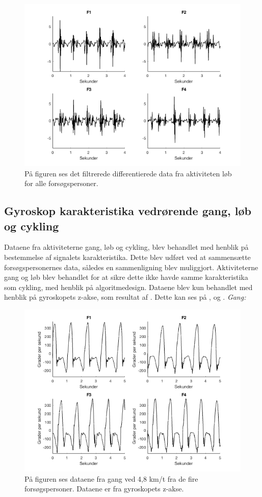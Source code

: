 \begin{figure}[H]
	\centering
	\includegraphics[scale=0.6]{figures/qBilag/loeb_diff}
	\caption{På figuren ses det filtrerede differentierede data fra aktiviteten løb for alle forsøgspersoner.}
	\label{fig:Ap_loebdiff}
\end{figure}

\subsection{Gyroskop karakteristika vedrørende gang, løb og cykling}
Dataene fra aktiviteterne gang, løb og cykling, blev behandlet med henblik på bestemmelse af signalets karakteristika. Dette blev udført ved at sammensætte forsøgspersonernes data, således en sammenligning blev muliggjort. Aktiviteterne gang og løb blev behandlet for at sikre dette ikke havde samme karakteristika som cykling, med henblik på algoritmedesign. Dataene blev kun behandlet med henblik på gyroskopets z-akse, som resultat af . Dette kan ses på ,  og .
\textit{Gang:}
\begin{figure}[H]
	\centering
	\includegraphics[scale=0.5]{figures/qBilag/gang_gyro}
	\caption{På figuren ses dataene fra gang ved 4,8 km/t fra de fire forsøgspersoner. Dataene er fra gyroskopets z-akse.}
	\label{fig:Ap_cykling1}
\end{figure}

